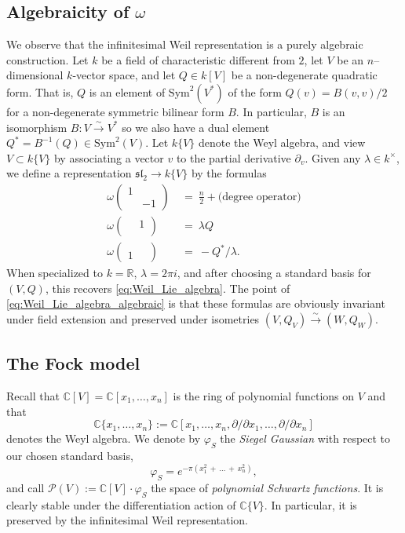 \documentclass[reqno, 11pt]{amsart} %
\numberwithin{equation}{section}
\theoremstyle{plain}
\theoremstyle{definition}
\theoremstyle{remark}
\newcommand{\mr}{\mathrm}
\newcommand{\mbC}{\mathbb{C}}
\newcommand{\mbR}{\mathbb{R}}
\newcommand{\mcP}{\mathcal{P}}
\newcommand{\mfl}{\mathfrak{l}}
\newcommand{\mfs}{\mathfrak{s}}
\newcommand{\mfsl}{\mfs\mfl}
\newcommand{\simto}{\overset{\sim}{\to}}
\begin{document}
\subsection{Algebraicity of $ω$}
\label{ss:infinitesimal_Weil_rep_algebraic}

We observe that the infinitesimal Weil representation is a purely algebraic construction. Let $k$ be a field of characteristic different from $2$, let $V$ be an $n$--dimensional $k$-vector space, and let $Q\in k[V]$ be a non-degenerate quadratic form. That is, $Q$ is an element of $\mr{Sym}^2(V^*)$ of the form $Q(v) = B(v,v)/2$ for a non-degenerate symmetric bilinear form $B$. In particular, $B$ is an isomorphism $B:V\simto V^*$ so we also have a dual element $Q^* = B^{-1}(Q) \in \mr{Sym}^2(V)$. Let $k \{ V\}$ denote the Weyl algebra, and view $V \subset k\{ V\}$ by associating a vector $v$ to the partial derivative $\partial_v$.  Given any $λ\in k^\times$, we define a representation $\mfsl_2 \to k\{V\}$ by the formulas
\begin{equation}\label{eq:Weil_Lie_algebra_algebraic}
\begin{aligned}
ω\left(\begin{smallmatrix}
1 & \\ & -1
\end{smallmatrix}\right) &\ =\ \frac{n}{2} + \text{(degree operator)}\\[1mm]
ω\left(\begin{smallmatrix}
& 1 \\ \ &
\end{smallmatrix}\right) &\ =\ λ Q\\[1mm]
ω\left(\begin{smallmatrix}
&\  \\ 1 &
\end{smallmatrix}\right) &\ =\ -Q^*/λ.
\end{aligned}
\end{equation}
When specialized to $k = \mbR$, $λ = 2πi$, and after choosing a standard basis for $(V, Q)$, this recovers \eqref{eq:Weil_Lie_algebra}. The point of \eqref{eq:Weil_Lie_algebra_algebraic} is that these formulas are obviously invariant under field extension and preserved under isometries $(V, Q_V)\simto (W, Q_W)$.

\subsection{The Fock model} \label{ss:Fock model}

Recall that $\mbC[V] = \mbC[x_1,\ldots,x_n]$ is the ring of polynomial functions on $V$ and that
$$\mbC\{x_1,\ldots,x_n\} := \mbC[x_1,\ldots,x_n, \partial/\partial x_1,\ldots, \partial/\partial x_n]$$
denotes the Weyl algebra. We denote by $φ_S$ the \emph{Siegel Gaussian} with respect to our chosen standard basis,
\begin{equation} \label{eq:Siegel Gaussian general}
\varphi_S = e^{- \pi(x_1^2\,+\, \ldots\, +\, x_n^2)},
\end{equation}
and call $\mcP(V) := \mbC[V]\cdot φ_S$ the space of \emph{polynomial Schwartz functions}. It is clearly stable under the differentiation action of $\mbC\{V\}$. In particular, it is preserved by the infinitesimal Weil representation.
\end{document}

